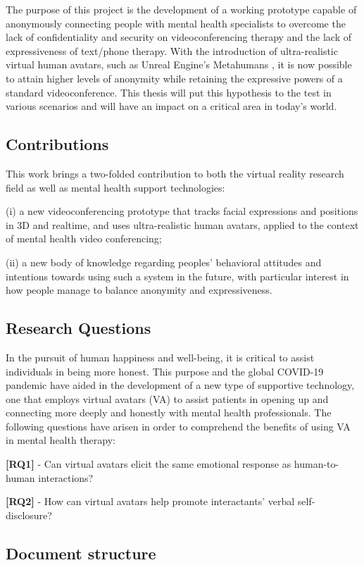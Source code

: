 The purpose of this project is the development of a working prototype capable of anonymously connecting people with mental health specialists to overcome the lack of confidentiality and security on videoconferencing therapy and the lack of expressiveness of text/phone therapy. With the introduction of ultra-realistic virtual human avatars, such as Unreal Engine's Metahumans \cite{EPI21, FAN21}, it is now possible to attain higher levels of anonymity while retaining the expressive powers of a standard videoconference. This thesis will put this hypothesis to the test in various scenarios and will have an impact on a critical area in today's world.

\subsection{Contributions}
This work brings a two-folded contribution to both the virtual reality research field as well as mental health support technologies:

(i) a new videoconferencing prototype that tracks facial expressions and positions in 3D and realtime, and uses ultra-realistic human avatars, applied to the context of mental health video conferencing;

(ii) a new body of knowledge regarding peoples’ behavioral attitudes and intentions towards using such a system in the future, with particular interest in how people manage to balance anonymity and expressiveness.

\subsection{Research Questions}
In the pursuit of human happiness and well-being, it is critical to assist individuals in being more honest. This purpose and the global COVID-19 pandemic have aided in the development of a new type of supportive technology, one that employs virtual avatars (VA) to assist patients in opening up and connecting more deeply and honestly with mental health professionals. The following questions have arisen in order to comprehend the benefits of using VA in mental health therapy:

\textbf{[RQ1]} - Can virtual avatars elicit the same emotional response as human-to-human interactions?

\textbf{[RQ2]} - How can virtual avatars help promote interactants' verbal self-disclosure?

\subsection{Document structure}


